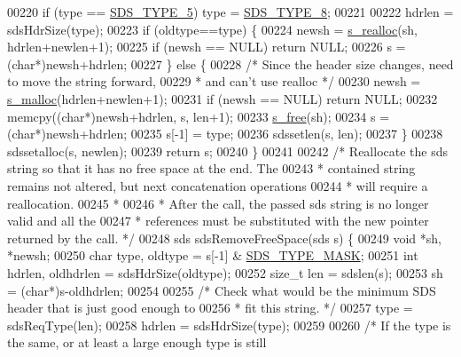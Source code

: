 \begin{DoxyCode}
{00220     \textcolor{keywordflow}{if} (type == \hyperlink{sds_8h_a3b7b67f1efa75f6b78ae18ea853b1a91}{SDS\_TYPE\_5}) type = \hyperlink{sds_8h_a504136356f04bfa2fd616dd4c8fdd71c}{SDS\_TYPE\_8};
00221 
00222     hdrlen = sdsHdrSize(type);
00223     \textcolor{keywordflow}{if} (oldtype==type) \{
00224         newsh = \hyperlink{sdsalloc_8h_a86d1b352c4e2c2848948649747bd296a}{s\_realloc}(sh, hdrlen+newlen+1);
00225         \textcolor{keywordflow}{if} (newsh == NULL) \textcolor{keywordflow}{return} NULL;
00226         s = (\textcolor{keywordtype}{char}*)newsh+hdrlen;
00227     \} \textcolor{keywordflow}{else} \{
00228         \textcolor{comment}{/* Since the header size changes, need to move the string forward,}
00229 \textcolor{comment}{         * and can't use realloc */}
00230         newsh = \hyperlink{sdsalloc_8h_a41e8c1188dca30db85c410c25fb417b6}{s\_malloc}(hdrlen+newlen+1);
00231         \textcolor{keywordflow}{if} (newsh == NULL) \textcolor{keywordflow}{return} NULL;
00232         memcpy((\textcolor{keywordtype}{char}*)newsh+hdrlen, s, len+1);
00233         \hyperlink{sdsalloc_8h_aa06cb49194c292098a753d87e2ac6b71}{s\_free}(sh);
00234         s = (\textcolor{keywordtype}{char}*)newsh+hdrlen;
00235         s[-1] = type;
00236         sdssetlen(s, len);
00237     \}
00238     sdssetalloc(s, newlen);
00239     \textcolor{keywordflow}{return} s;
00240 \}
00241 
00242 \textcolor{comment}{/* Reallocate the sds string so that it has no free space at the end. The}
00243 \textcolor{comment}{ * contained string remains not altered, but next concatenation operations}
00244 \textcolor{comment}{ * will require a reallocation.}
00245 \textcolor{comment}{ *}
00246 \textcolor{comment}{ * After the call, the passed sds string is no longer valid and all the}
00247 \textcolor{comment}{ * references must be substituted with the new pointer returned by the call. */}
00248 sds sdsRemoveFreeSpace(sds s) \{
00249     \textcolor{keywordtype}{void} *sh, *newsh;
00250     \textcolor{keywordtype}{char} type, oldtype = s[-1] & \hyperlink{sds_8h_a07564783f389fdd7772a8f61d55d9ddf}{SDS\_TYPE\_MASK};
00251     \textcolor{keywordtype}{int} hdrlen, oldhdrlen = sdsHdrSize(oldtype);
00252     size\_t len = sdslen(s);
00253     sh = (\textcolor{keywordtype}{char}*)s-oldhdrlen;
00254 
00255     \textcolor{comment}{/* Check what would be the minimum SDS header that is just good enough to}
00256 \textcolor{comment}{     * fit this string. */}
00257     type = sdsReqType(len);
00258     hdrlen = sdsHdrSize(type);
00259 
00260     \textcolor{comment}{/* If the type is the same, or at least a large enough type is still}
}
\end{DoxyCode}

